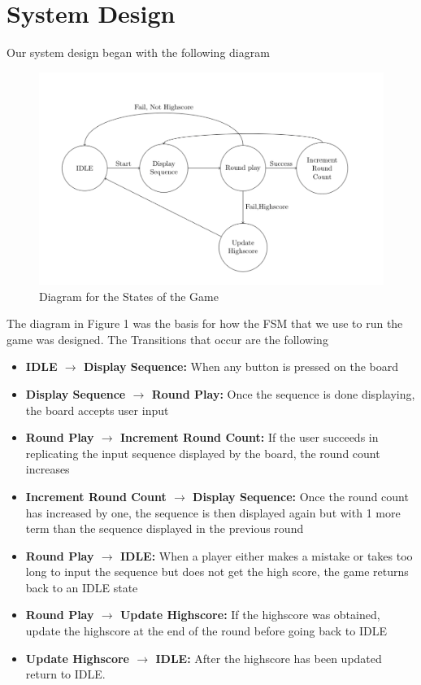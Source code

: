 \documentclass{report}
\begin{document}
\section{System Design}
Our system design began with the following diagram
\begin{figure}[H]
    \includegraphics[width=\textwidth]{images/image4.png}
    \caption{Diagram for the States of the Game}
\end{figure}
The diagram in Figure 1 was the basis for how the FSM that we use to run the game was designed. The Transitions that occur are the following
\begin{itemize}
    \item \textbf{IDLE $\rightarrow$ Display Sequence:} When any button is pressed on the board
    \item \textbf{Display Sequence $\rightarrow$ Round Play:} Once the sequence is done displaying, the board accepts user input
    \item \textbf{Round Play $\rightarrow$ Increment Round Count:} If the user succeeds in replicating the input sequence displayed by the board, the round count increases
    \item \textbf{Increment Round Count $\rightarrow$ Display Sequence:} Once the round count has increased by one, the sequence is then displayed again but with 1 more term than the sequence displayed in the previous round
    \item \textbf{Round Play $\rightarrow$ IDLE:} When a player either makes a mistake or takes too long to input the sequence but does not get the high score, the game returns back to an IDLE state
    \item \textbf{Round Play $\rightarrow$ Update Highscore:} If the highscore was obtained, update the highscore at the end of the round before going back to IDLE
    \item \textbf{Update Highscore $\rightarrow$ IDLE:} After the highscore has been updated return to IDLE.
\end{itemize}
\end{document}
